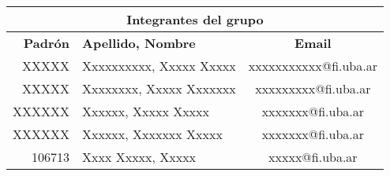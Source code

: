\documentclass{standalone}
\begin{document}
\begin{tabular}{@{}rlc@{}}
    \multicolumn{3}{c}{Integrantes del grupo}                             \\ \midrule
    \textbf{Padrón} & \textbf{Apellido, Nombre}   & \textbf{Email}        \\ \midrule
    XXXXX           & Xxxxxxxxxx, Xxxxx Xxxxx     & xxxxxxxxxxx@fi.uba.ar \\
    XXXXX           & Xxxxxxxx, Xxxxx Xxxxxxx     & xxxxxxxxx@fi.uba.ar   \\
    XXXXXX          & Xxxxxx, Xxxxx Xxxxx         & xxxxxxx@fi.uba.ar     \\
    XXXXXX          & Xxxxxx, Xxxxxxx Xxxxx       & xxxxxxx@fi.uba.ar     \\
    106713          & Xxxx Xxxxx, Xxxxx           & xxxxx@fi.uba.ar       \\ \bottomrule
    \end{tabular}
\end{document}
